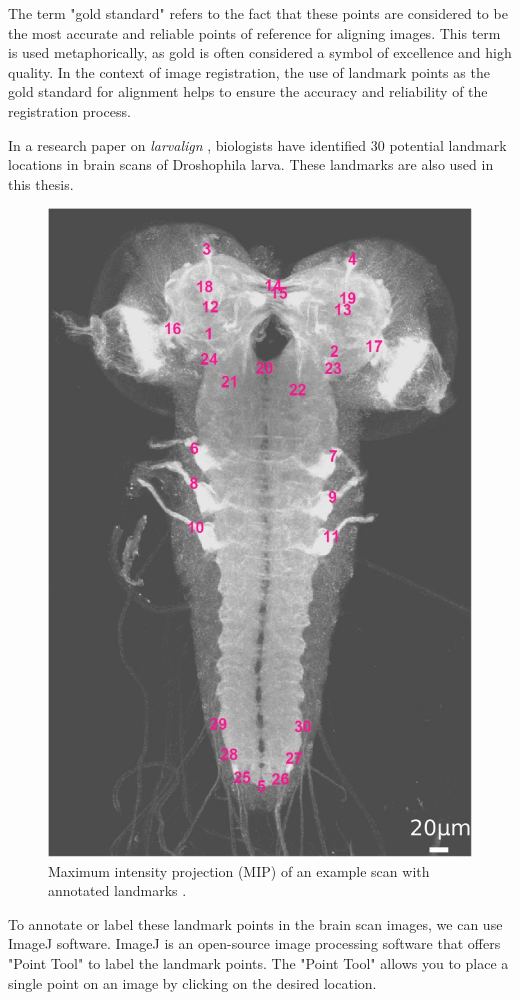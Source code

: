 \documentclass{report}
\begin{document}
	The term "gold standard" refers to the fact that these points are considered to be the most accurate and reliable points of reference for aligning images. This term is used metaphorically, as gold is often considered a symbol of excellence and high quality. In the context of image registration, the use of landmark points as the gold standard for alignment helps to ensure the accuracy and reliability of the registration process.
	
	In a research paper on \textit{larvalign} \cite{larvalign}, biologists have identified 30 potential landmark locations in brain scans of Droshophila larva. These landmarks are also used in this thesis.
	
	\begin{figure}[h!]
		\centering
		\includegraphics[width=0.5\columnwidth]{resources/chapter3/landmarks.jpg}
		\caption{Maximum intensity projection (MIP) of an example scan with annotated landmarks \cite{larvalign}.}
		\label{fig:landmark_annotations}
	\end{figure}
	
	To annotate or label these landmark points in the brain scan images, we can use ImageJ software. ImageJ is an open-source image processing software that offers "Point Tool" to label the landmark points. The "Point Tool" allows you to place a single point on an image by clicking on the desired location.
	
\end{document}

